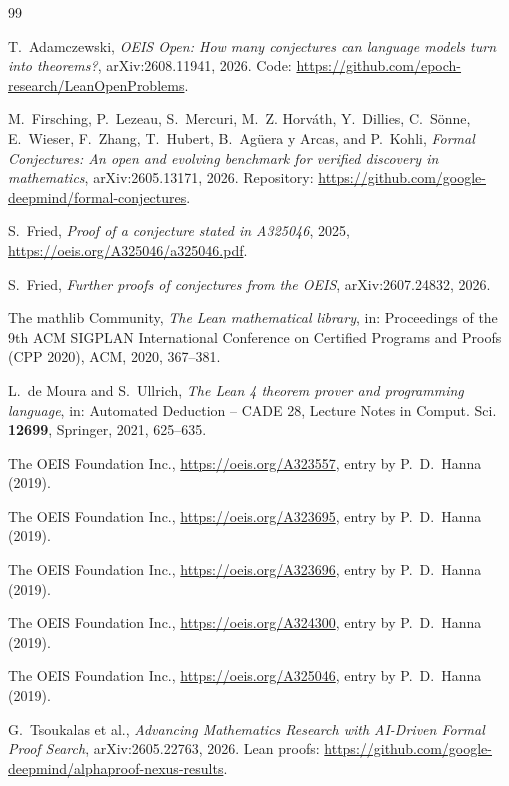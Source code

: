 \documentclass[11pt]{amsart}
\theoremstyle{plain}
\theoremstyle{definition}
\begin{document}
\begin{thebibliography}{99}

T.~Adamczewski, \emph{OEIS Open: How many conjectures can language models turn into theorems?}, arXiv:2608.11941, 2026. Code: \url{https://github.com/epoch-research/LeanOpenProblems}.

M.~Firsching, P.~Lezeau, S.~Mercuri, M.~Z. Horv\'ath, Y.~Dillies, C.~S\"onne, E.~Wieser, F.~Zhang, T.~Hubert, B.~Ag\"uera y Arcas, and P.~Kohli, \emph{Formal Conjectures: An open and evolving benchmark for verified discovery in mathematics}, arXiv:2605.13171, 2026. Repository: \url{https://github.com/google-deepmind/formal-conjectures}.

S.~Fried, \emph{Proof of a conjecture stated in A325046}, 2025, \url{https://oeis.org/A325046/a325046.pdf}.

S.~Fried, \emph{Further proofs of conjectures from the OEIS}, arXiv:2607.24832, 2026.

The mathlib Community, \emph{The Lean mathematical library}, in: Proceedings of the 9th ACM SIGPLAN International Conference on Certified Programs and Proofs (CPP 2020), ACM, 2020, 367--381.

L.~de Moura and S.~Ullrich, \emph{The Lean 4 theorem prover and programming language}, in: Automated Deduction -- CADE 28, Lecture Notes in Comput. Sci. \textbf{12699}, Springer, 2021, 625--635.

The OEIS Foundation Inc., \url{https://oeis.org/A323557}, entry by P.~D.~Hanna (2019).

The OEIS Foundation Inc., \url{https://oeis.org/A323695}, entry by P.~D.~Hanna (2019).

The OEIS Foundation Inc., \url{https://oeis.org/A323696}, entry by P.~D.~Hanna (2019).

The OEIS Foundation Inc., \url{https://oeis.org/A324300}, entry by P.~D.~Hanna (2019).

The OEIS Foundation Inc., \url{https://oeis.org/A325046}, entry by P.~D.~Hanna (2019).

G.~Tsoukalas et al., \emph{Advancing Mathematics Research with AI-Driven Formal Proof Search}, arXiv:2605.22763, 2026. Lean proofs: \url{https://github.com/google-deepmind/alphaproof-nexus-results}.

\end{thebibliography}
\end{document}
